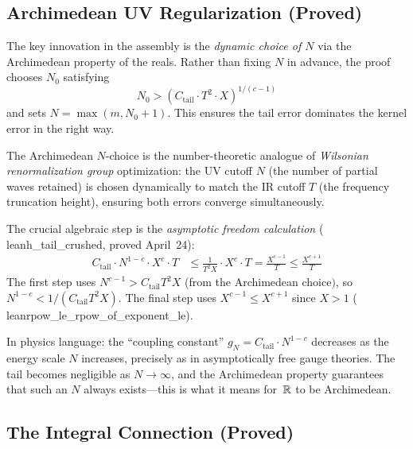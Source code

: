 \documentclass[11pt,a4paper]{article}
\begin{document}
\subsection{Archimedean UV Regularization (Proved)}

The key innovation in the assembly is the \emph{dynamic choice of $N$}
via the Archimedean property of the reals. Rather than fixing $N$ in
advance, the proof chooses $N_0$ satisfying
\[
  N_0 > (C_{\mathrm{tail}} \cdot T^2 \cdot X)^{1/(c-1)}
\]
and sets $N = \max(m, N_0 + 1)$. This ensures the tail error dominates
the kernel error in the right way.

\begin{principle}
The Archimedean $N$-choice is the number-theoretic analogue of
\emph{Wilsonian renormalization group} optimization: the UV cutoff $N$
(the number of partial waves retained) is chosen dynamically to match
the IR cutoff $T$ (the frequency truncation height), ensuring both
errors converge simultaneously.

The crucial algebraic step is the \emph{asymptotic freedom calculation}
(\\lean{h\_tail\_crushed}, proved April~24):
\begin{align}
  C_{\mathrm{tail}} \cdot N^{1-c} \cdot X^c \cdot T
  &\leq \frac{1}{T^2 X} \cdot X^c \cdot T
  = \frac{X^{c-1}}{T}
  \leq \frac{X^{c+1}}{T}
\end{align}
The first step uses $N^{c-1} > C_{\mathrm{tail}} T^2 X$ (from the
Archimedean choice$)$, so $N^{1-c} < 1/(C_{\mathrm{tail}} T^2 X)$.
The final step uses $X^{c-1} \leq X^{c+1}$ since $X > 1$
(\\lean{rpow\_le\_rpow\_of\_exponent\_le}).

In physics language: the ``coupling constant'' $g_N = C_{\mathrm{tail}} \cdot N^{1-c}$
decreases as the energy scale $N$ increases, precisely as in
asymptotically free gauge theories. The tail becomes negligible as
$N \to \infty$, and the Archimedean property guarantees that such an
$N$ always exists---this is what it means for~$\mathbb{R}$ to be Archimedean.
\end{principle}

\subsection{The Integral Connection (Proved)}
\end{document}
